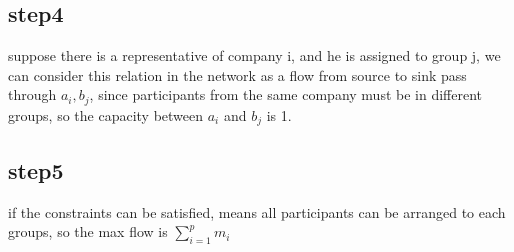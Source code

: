 \documentclass{article}
\begin{document}
\begin{CJK*}{UTF8}{bkai}
\subsection*{step4}
suppose there is a representative of company i, and he is assigned to group j, we can consider this relation in the network as a flow from source to sink pass through $a_{i}, b_{j}$, since participants from the same company must be in different groups, so the capacity between $a_{i}$ and $b_{j}$ is 1.
\subsection*{step5}
if the constraints can be satisfied, means all participants can be arranged to each groups, so the max flow is $\sum_{i=1}^{p} m_{i}$
\end{CJK*}
\end{document}
